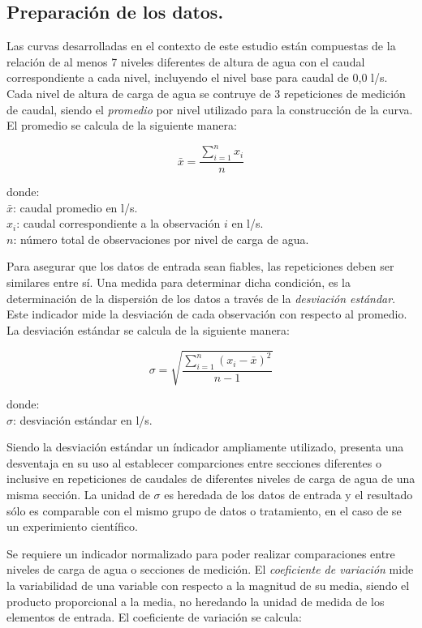 \documentclass[]{article}
\begin{document}
\subsection{Preparación de los datos.}\label{preparacion-de-los-datos.}

Las curvas desarrolladas en el contexto de este estudio están compuestas
de la relación de al menos 7 niveles diferentes de altura de agua con el
caudal correspondiente a cada nivel, incluyendo el nivel base para caudal de 0,0 l/s. Cada nivel de altura de carga de agua se contruye de 3 repeticiones de medición de caudal, siendo el \emph{promedio} por nivel utilizado para la construcción de la curva. El promedio se calcula de la siguiente manera:

\[\bar x = \frac{{\sum\limits_{i = 1}^n {{x_i}} }}{n}\]

donde:\\
\(\bar x\): caudal promedio en l/s.\\
\(x_i\): caudal correspondiente a la observación \(i\) en l/s.\\
\(n\): número total de observaciones por nivel de carga de agua.

Para asegurar que los datos de entrada sean fiables, las repeticiones
deben ser similares entre sí. Una medida para determinar dicha
condición, es la determinación de la dispersión de los datos a través de
la \emph{desviación estándar}. Este indicador mide la desviación de cada
observación con respecto al promedio. La desviación estándar se calcula
de la siguiente manera:

\[\sigma = \sqrt {\frac{{\sum\limits_{i = 1}^n {{{\left( {{x_i} - \bar x} \right)}^2}} }}{{n - 1}}} \]

donde:\\
\(\sigma\): desviación estándar en l/s.

Siendo la desviación estándar un índicador ampliamente utilizado,
presenta una desventaja en su uso al establecer comparciones entre
secciones diferentes o inclusive en repeticiones de caudales de
diferentes niveles de carga de agua de una misma sección. La unidad de
\(\sigma\) es heredada de los datos de entrada y el resultado sólo es
comparable con el mismo grupo de datos o tratamiento, en el caso de se
un experimiento científico.

Se requiere un indicador normalizado para poder realizar comparaciones
entre niveles de carga de agua o secciones de medición. El
\emph{coeficiente de variación} mide la variabilidad de una variable con
respecto a la magnitud de su media, siendo el producto proporcional a la
media, no heredando la unidad de medida de los elementos de entrada. El
coeficiente de variación se calcula:
\end{document}
